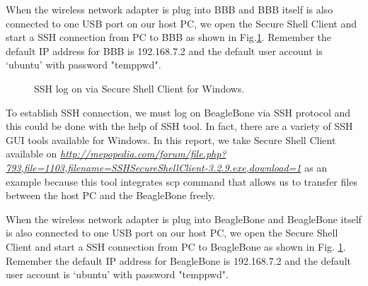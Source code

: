 \documentclass[12pt,journal,draftclsnofoot,onecolumn]{IEEEtran}
\begin{document}
When the wireless network adapter is plug into BBB and BBB itself is also connected to one USB port on our host PC, we open the Secure Shell Client and start a SSH connection from PC to BBB as shown in Fig.\ref{ssh}. Remember the default IP address for BBB is 192.168.7.2 and the default user account is `ubuntu' with password "temppwd".


\begin{figure}[htb]
	\centering

     \caption{SSH log on via Secure Shell Client for Windows.}\label{ssh}
     \end{figure}

To establish SSH connection, we must log on BeagleBone via SSH protocol and this could be done with the help of SSH tool. In fact, there are a variety of SSH GUI tools available for Windows. In this report, we take Secure Shell Client available on \textcolor{blue}{\textit{\url{http://mepopedia.com/forum/file.php?793,file=1103,filename=SSHSecureShellClient-3.2.9.exe,download=1}}}  as an example because this tool integrates scp command that allows us to transfer files between the host PC and the BeagleBone freely.

When the wireless network adapter is plug into BeagleBone and BeagleBone itself is also connected to one USB port on our host PC, we open the Secure Shell Client and start a SSH connection from PC to BeagleBone as shown in Fig. \ref{ssh}. Remember the default IP address for BeagleBone is 192.168.7.2 and the default user account is `ubuntu' with password "temppwd".
\end{document}
